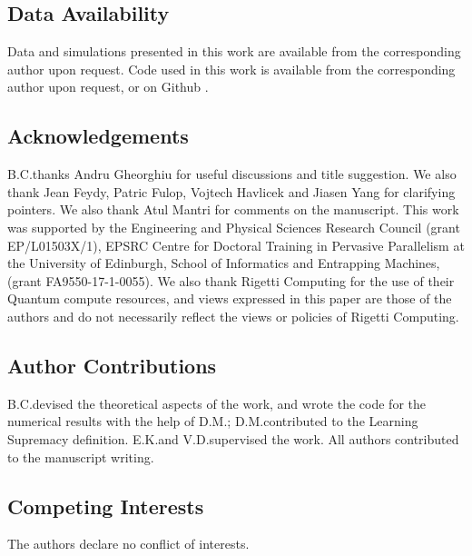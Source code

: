 \documentclass[10.3pt, a4paper ]{article}
\begin{document}

\maketitle

\begin{multicols}{2}







\subsection*{Data Availability}\label{sec:data_availability}
Data and simulations presented in this work are available from the corresponding author upon request. Code used in this work is available from the corresponding author upon request, or on Github \cite{briancoyle_implementation_2019}.
\subsection*{Acknowledgements}\label{sec:acknowledgements}

B.C.\@ thanks Andru Gheorghiu for useful discussions and title suggestion. We also thank Jean Feydy, Patric Fulop, Vojtech Havlicek and Jiasen Yang for clarifying pointers. We also thank Atul Mantri for comments on the manuscript. This work was supported by the Engineering and Physical Sciences Research Council (grant EP/L01503X/1), EPSRC Centre for Doctoral Training in Pervasive Parallelism at the University of Edinburgh, School of Informatics and Entrapping Machines, (grant FA9550-17-1-0055). We also thank Rigetti Computing for the use of their Quantum compute resources, and views expressed in this paper are those of the authors and do not necessarily reflect the views or policies of Rigetti Computing.

\subsection*{Author Contributions}
B.C.\@ devised the theoretical aspects of the work, and wrote the code for the numerical results with the help of D.M.\@; D.M.\@ contributed to the Learning Supremacy definition. 
E.K.\@ and V.D.\@ supervised the work. All authors contributed to the manuscript writing. 

\subsection*{Competing Interests}
The authors declare no conflict of interests.

% 


\end{multicols}
\end{document}
